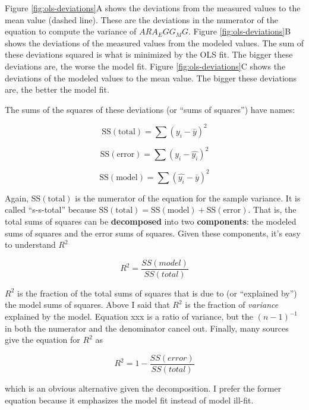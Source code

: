 \documentclass[]{book}
\begin{document}
Figure \ref{fig:ols-deviations}A shows the deviations from the measured values to the mean value (dashed line). These are the deviations in the numerator of the equation to compute the variance of \(ARA_EGG_MG\). Figure \ref{fig:ols-deviations}B shows the deviations of the measured values from the modeled values. The sum of these deviations squared is what is minimized by the OLS fit. The bigger these deviations are, the worse the model fit. Figure \ref{fig:ols-deviations}C shows the deviations of the modeled values to the mean value. The bigger these deviations are, the better the model fit.

The sums of the squares of these deviations (or ``sums of squares'') have names:

\begin{equation}
\mathrm{SS(total)} = \sum{(y_i - \bar{y})^2}
\end{equation}

\begin{equation}
\mathrm{SS(error)} = \sum{(y_i - \hat{y_i})^2}
\end{equation}

\begin{equation}
\mathrm{SS(model)} = \sum{(\hat{y_i} - \bar{y})^2}
\end{equation}

Again, \(\mathrm{SS(total)}\) is the numerator of the equation for the sample variance. It is called ``s-s-total'' because \(\mathrm{SS(total)} = \mathrm{SS(model)} + \mathrm{SS(error)}\). That is, the total sums of squares can be \textbf{decomposed} into two \textbf{components}: the modeled sums of squares and the error sums of squares. Given these components, it's easy to understand \(R^2\)

\begin{equation}
R^2 = \frac{SS(model)}{SS(total)}
\end{equation}

\(R^2\) is the fraction of the total sums of squares that is due to (or ``explained by'') the model sums of squares. Above I said that \(R^2\) is the fraction of \emph{variance} explained by the model. Equation xxx is a ratio of variance, but the \((n-1)^{-1}\) in both the numerator and the denominator cancel out. Finally, many sources give the equation for \(R^2\) as

\begin{equation}
R^2 = 1- \frac{SS(error)}{SS(total)}
\end{equation}

which is an obvious alternative given the decomposition. I prefer the former equation because it emphasizes the model fit instead of model ill-fit.
\end{document}

